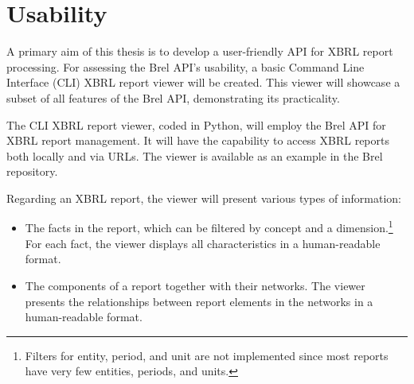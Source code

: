 \section{Usability}
\label{sec:usability}



A primary aim of this thesis is to develop a user-friendly API for XBRL report processing.  
For assessing the Brel API's usability, a basic Command Line Interface (CLI) XBRL report viewer will be created.  
This viewer will showcase a subset of all features of the Brel API, demonstrating its practicality.

The CLI XBRL report viewer, coded in Python, will employ the Brel API for XBRL report management.  
It will have the capability to access XBRL reports both locally and via URLs.
The viewer is available as an example in the Brel repository\cite{brel_source}.

Regarding an XBRL report, the viewer will present various types of information:

\begin{itemize}
    \item The facts in the report, which can be filtered by concept and a dimension.\footnote{Filters for entity, period, and unit are not implemented since most reports have very few entities, periods, and units.}
    For each fact, the viewer displays all characteristics in a human-readable format.
    \item The components of a report together with their networks.
    The viewer presents the relationships between report elements in the networks in a human-readable format.
\end{itemize}

